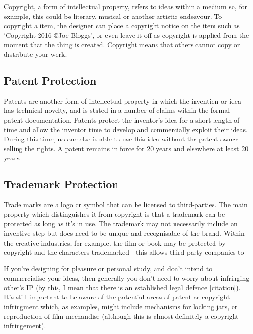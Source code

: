 Copyright, a form of intellectual property, refers to ideas within a medium so, for example, this could be literary, musical or another artistic endeavour. To copyright a item, the designer can place a copyright notice on the item such as `Copyright 2016 \copyright Joe Bloggs`, or even leave it off as copyright is applied from the moment that the thing is created. Copyright means that others cannot copy or distribute your work. 

\subsection{Patent Protection}

Patents are another form of intellectual property in which the invention or idea has technical novelty, and is stated in a number of claims within the formal patent documentation. Patents protect the inventor's idea for a short length of time and allow the inventor time to develop and commercially exploit their ideas. During this time, no one else is able to use this idea without the patent-owner selling the rights. A patent remains in force for 20 years and elsewhere at least 20 years. 

\subsection{Trademark Protection}

Trade marks are a logo or symbol that can be licensed to third-parties. The main property which distinguishes it from copyright is that a trademark can be protected as long as it's in use. The trademark may not necessarily include an inventive step but does need to be unique and recognisable of the brand. Within the creative industries, for example, the film or book may be protected by copyright and the characters trademarked - this allows third party companies to 

If you're designing for pleasure or personal study, and don't intend to commercialise your ideas, then generally you don't need to worry about infringing other's IP (by this, I mean that there is an established legal defence [citation]). It's still important to be aware of the potential areas of patent or copyright infringment which, as examples, might include mechanisms for locking jars, or reproduction of film mechandise (although this is almost definitely a copyright infringement). 

